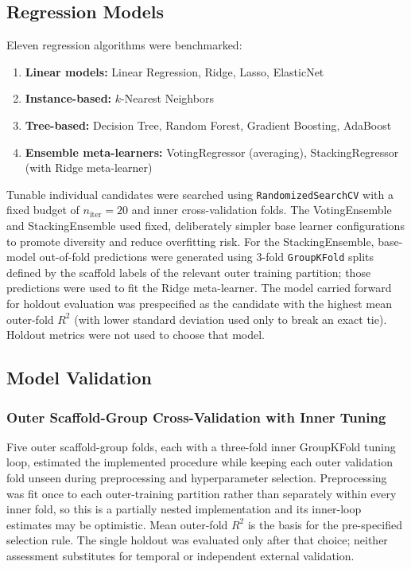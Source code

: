 \documentclass[11pt]{article}
\begin{document}
\subsection{Regression Models}

Eleven regression algorithms were benchmarked:

\begin{enumerate}
    \item \textbf{Linear models:} Linear Regression, Ridge, Lasso, ElasticNet
    \item \textbf{Instance-based:} $k$-Nearest Neighbors
    \item \textbf{Tree-based:} Decision Tree, Random Forest, Gradient Boosting, AdaBoost
    \item \textbf{Ensemble meta-learners:} VotingRegressor (averaging), StackingRegressor (with Ridge meta-learner)
\end{enumerate}

Tunable individual candidates were searched using \texttt{RandomizedSearchCV} with a
fixed budget of $n_{\text{iter}} = 20$ and inner cross-validation folds. The VotingEnsemble
and StackingEnsemble used fixed, deliberately simpler base learner configurations to promote
diversity and reduce overfitting risk.
For the StackingEnsemble, base-model out-of-fold predictions were generated using
3-fold \texttt{GroupKFold} splits defined by the scaffold labels of the relevant outer
training partition; those predictions were used to fit the Ridge meta-learner. The model
carried forward for holdout evaluation was prespecified as the candidate with the highest
mean outer-fold $R^2$ (with lower standard deviation used only to break an exact tie).
Holdout metrics were not used to choose that model.

\subsection{Model Validation}

\subsubsection{Outer Scaffold-Group Cross-Validation with Inner Tuning}

Five outer scaffold-group folds, each with a three-fold inner GroupKFold tuning loop,
estimated the implemented procedure while keeping each outer validation fold unseen during
preprocessing and hyperparameter selection. Preprocessing was fit once to each outer-training
partition rather than separately within every inner fold, so this is a partially nested
implementation and its inner-loop estimates may be optimistic. Mean outer-fold $R^2$ is the
basis for the pre-specified selection rule. The single holdout was evaluated only after that
choice; neither assessment substitutes for temporal or independent external validation.
\end{document}
